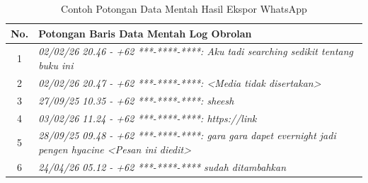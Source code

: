 \begingroup
\renewcommand{\arraystretch}{1.2}
\begin{table}[H]
\centering
\caption{Contoh Potongan Data Mentah Hasil Ekspor WhatsApp}
\label{tab:contoh-data-mentah}
\scriptsize
\begin{tabular}{cp{12.5cm}}
\toprule
\textbf{No.} & \textbf{Potongan Baris Data Mentah Log Obrolan} \\
\midrule
1 & \textit{02/02/26 20.46 - +62 ***-****-****: Aku tadi searching sedikit tentang buku ini} \\
2 & \textit{02/02/26 20.47 - +62 ***-****-****: <Media tidak disertakan>} \\
3 & \textit{27/09/25 10.35 - +62 ***-****-****: sheesh} \\
4 & \textit{03/02/26 11.24 - +62 ***-****-****: https://link} \\
5 & \textit{28/09/25 09.48 - +62 ***-****-****: gara gara dapet evernight jadi pengen hyacine <Pesan ini diedit>} \\
6 & \textit{24/04/26 05.12 - +62 ***-****-**** sudah ditambahkan} \\
\bottomrule
\end{tabular}
\end{table}
\endgroup
